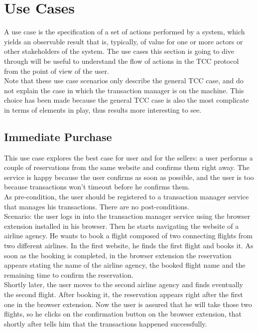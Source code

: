 \section{Use Cases}
A use case is the specification of a set of actions performed by a system, which yields an observable result that is, typically, of value for one or more actors or other stakeholders of the system. The use cases this section is going to dive through will be useful to understand the flow of actions in the TCC protocol from the point of view of the user.\\
Note that these use case scenarios only describe the general TCC case, and do not explain the case in which the transaction manager is on the machine. This choice has been made because the general TCC case is also the most complicate in terms of elements in play, thus results more interesting to see.

\subsection{Immediate Purchase}
This use case explores the best case for user and for the sellers: a user performs a couple of reservations from the same website and confirms them right away. The service is happy because the user confirms as soon as possible, and the user is too because transactions won't timeout before he confirms them.\\
As pre-condition, the user should be registered to a transaction manager service that manages his transactions. There are no post-conditions.\\
Scenario: the user logs in into the transaction manager service using the browser extension installed in his browser. Then he starts navigating the website of a airline agency. He wants to book a flight composed of two connecting flights from two different airlines. In the first website, he finds the first flight and books it. As soon as the booking is completed, in the browser extension the reservation appears stating the name of the airline agency, the booked flight name and the remaining time to confirm the reservation.\\
Shortly later, the user moves to the second airline agency and finds eventually the second flight. After booking it, the reservation appears right after the first one in the browser extension. Now the user is assured that he will take those two flights, so he clicks on the confirmation button on the browser extension, that shortly after tells him that the transactions happened successfully.

